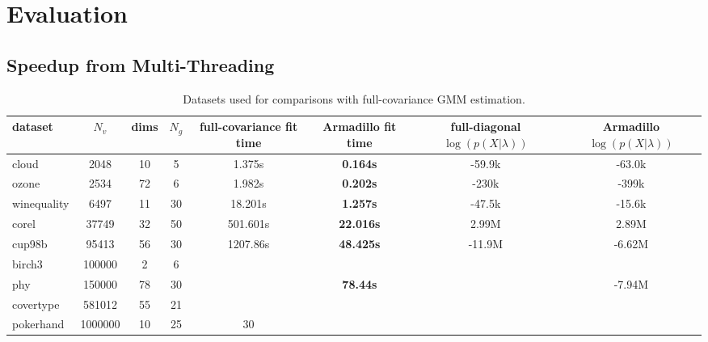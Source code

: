 \section{Evaluation}
\label{sec:eval}

\subsection{Speedup from Multi-Threading}

\begin{table*}
\begin{center}
\begin{tabular}{|l|c|c|c|c|c|c|c|}
\hline
{\bf dataset} & {\bf $N_v$} & {\bf dims} & {\bf $N_g$} & {\bf full-covariance fit time} & {\bf Armadillo fit time} & {\bf full-diagonal $\log(p(X|\lambda))$} & {\bf Armadillo $\log(p(X|\lambda))$} \\
\hline
cloud & 2048 & 10 & 5 & 1.375s & {\bf 0.164s} & -59.9k & -63.0k \\
ozone & 2534 & 72 & 6 & 1.982s & {\bf 0.202s} & -230k & -399k \\
winequality & 6497 & 11 & 30 & 18.201s & {\bf 1.257s} & -47.5k & -15.6k
\\
corel & 37749 & 32 & 50 & 501.601s & {\bf 22.016s} & 2.99M & 2.89M \\
cup98b & 95413 & 56 & 30 & 1207.86s & {\bf 48.425s} & -11.9M & -6.62M \\
birch3 & 100000 & 2 & 6 & \\
phy & 150000 & 78 & 30 & & {\bf 78.44s} & & -7.94M \\
covertype & 581012 & 55 & 21 & \\
pokerhand & 1000000 & 10 & 25 & 30 & \\
\hline
\end{tabular}
\end{center}
\caption{Datasets used for comparisons with full-covariance GMM estimation.}
\label{tab:results}
\end{table*}

